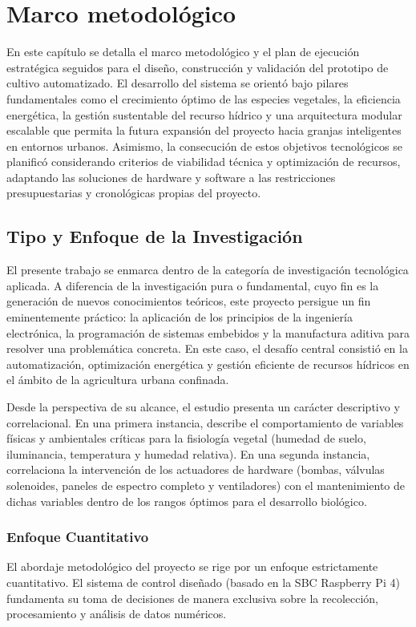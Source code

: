 \chapter{Marco metodológico}
En este capítulo se detalla el marco metodológico y el plan de ejecución estratégica seguidos para el diseño, construcción y validación del prototipo de cultivo automatizado. El desarrollo del sistema se orientó bajo pilares fundamentales como el crecimiento óptimo de las especies vegetales, la eficiencia energética, la gestión sustentable del recurso hídrico y una arquitectura modular escalable que permita la futura expansión del proyecto hacia granjas inteligentes en entornos urbanos. Asimismo, la consecución de estos objetivos tecnológicos se planificó considerando criterios de viabilidad técnica y optimización de recursos, adaptando las soluciones de hardware y software a las restricciones presupuestarias y cronológicas propias del proyecto.

\section{Tipo y Enfoque de la Investigación}
El presente trabajo se enmarca dentro de la categoría de investigación tecnológica aplicada. A diferencia de la investigación pura o fundamental, cuyo fin es la generación de nuevos conocimientos teóricos, este proyecto persigue un fin eminentemente práctico: la aplicación de los principios de la ingeniería electrónica, la programación de sistemas embebidos y la manufactura aditiva para resolver una problemática concreta. En este caso, el desafío central consistió en la automatización, optimización energética y gestión eficiente de recursos hídricos en el ámbito de la agricultura urbana confinada. 

Desde la perspectiva de su alcance, el estudio presenta un carácter descriptivo y correlacional. En una primera instancia, describe el comportamiento de variables físicas y ambientales críticas para la fisiología vegetal (humedad de suelo, iluminancia, temperatura y humedad relativa). En una segunda instancia, correlaciona la intervención de los actuadores de hardware (bombas, válvulas solenoides, paneles de espectro completo y ventiladores) con el mantenimiento de dichas variables dentro de los rangos óptimos para el desarrollo biológico.

\subsection{Enfoque Cuantitativo}
El abordaje metodológico del proyecto se rige por un enfoque estrictamente cuantitativo. El sistema de control diseñado (basado en la SBC Raspberry Pi 4) fundamenta su toma de decisiones de manera exclusiva sobre la recolección, procesamiento y análisis de datos numéricos. 

